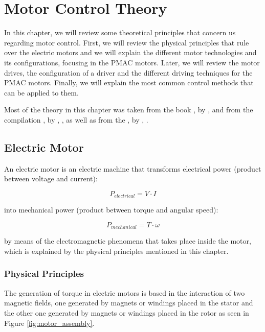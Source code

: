\chapter{Motor Control Theory} \label{chap:theory}

In this chapter, we will review some theoretical principles that concern us regarding motor control. First, we will review the physical principles that rule over the electric motors and we will explain the different motor technologies and its configurations, focusing in the \acf{PMAC} motors. Later, we will review the motor drives, the configuration of a driver and the different driving techniques for the \ac{PMAC} motors. Finally, we will explain the most common control methods that can be applied to them.

Most of the theory in this chapter was taken from the book , by \citeauthor{sistemi_di_controllo:2007}, \citeyear{sistemi_di_controllo:2007} and from the compilation , by \citeauthor{AC_drives}, \citeyear{AC_drives}, as well as from the , by \citeauthor{GhioniPowerElec}, \citeyear{GhioniPowerElec}.


\section{Electric Motor}

An electric motor is an electric machine that transforms electrical power (product between voltage and current):

\begin{equation}
	\label{eq:p_elec}
	P_{electrical} = V \cdot I
\end{equation}

into mechanical power (product between torque and angular speed):

\begin{equation}
	\label{eq:p_mech}
	P_{mechanical} = T \cdot \omega
\end{equation}

by means of the electromagnetic phenomena that takes place inside the motor, which is explained by the physical principles mentioned in this chapter.

\subsection{Physical Principles} \label{physical_principles}

The generation of torque in electric motors is based in the interaction of two magnetic fields, one generated by magnets or windings placed in the stator and the other one generated by magnets or windings placed in the rotor as seen in Figure \ref{fig:motor_assembly}.

